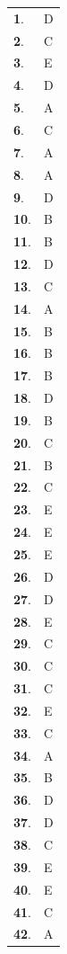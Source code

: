 \documentclass[letterstyle,12pt]{extarticle}
\begin{document}
\clearpage 

\twocolumn

\begin{supertabular}{ll}
{\bf1}. & D \\ 
{\bf2}. & C \\ 
{\bf3}. & E \\ 
{\bf4}. & D \\ 
{\bf5}. & A \\ 
{\bf6}. & C \\ 
{\bf7}. & A \\ 
{\bf8}. & A \\ 
{\bf9}. & D \\ 
{\bf10}. & B \\ 
{\bf11}. & B \\ 
{\bf12}. & D \\ 
{\bf13}. & C \\ 
{\bf14}. & A \\ 
{\bf15}. & B \\ 
{\bf16}. & B \\ 
{\bf17}. & B \\ 
{\bf18}. & D \\ 
{\bf19}. & B \\ 
{\bf20}. & C \\ 
{\bf21}. & B \\ 
{\bf22}. & C \\ 
{\bf23}. & E \\ 
{\bf24}. & E \\ 
{\bf25}. & E \\ 
{\bf26}. & D \\ 
{\bf27}. & D \\ 
{\bf28}. & E \\ 
{\bf29}. & C \\ 
{\bf30}. & C \\ 
{\bf31}. & C \\ 
{\bf32}. & E \\ 
{\bf33}. & C \\ 
{\bf34}. & A \\ 
{\bf35}. & B \\ 
{\bf36}. & D \\ 
{\bf37}. & D \\ 
{\bf38}. & C \\ 
{\bf39}. & E \\ 
{\bf40}. & E \\ 
{\bf41}. & C \\ 
{\bf42}. & A \\ 

\end{supertabular}
\end{document}
